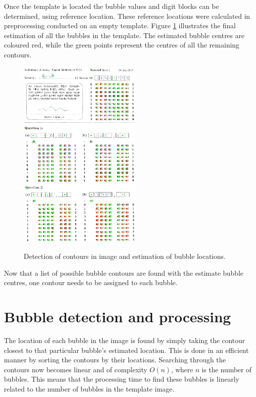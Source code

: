 Once the template is located the bubble values and digit blocks can be determined, using reference location. These reference locations were calculated in preprocessing conducted on an empty template. Figure \ref{fig:FinalEstimate} illustrates the final estimation of all the bubbles in the template. The estimated bubble centres are coloured red, while the green points represent the centres of all the remaining contours.

\begin{figure}
  \centering
  \includegraphics[width=6cm]{FinalEstimate}\\
  \caption{Detection of contours in image and estimation of bubble locations.}
  \label{fig:FinalEstimate}
\end{figure}

Now that a list of possible bubble contours are found with the estimate bubble centres, one contour needs to be assigned to each bubble.

\section{Bubble detection and processing}
The location of each bubble in the image is found by simply taking the contour closest to that particular bubble's estimated location. This is done in an efficient manner by sorting the contours by their locations. Searching through the contours now becomes linear and of complexity $O(n)$, where $n$ is the number of bubbles. This means that the processing time to find these bubbles is linearly related to the number of bubbles in the template image. 

